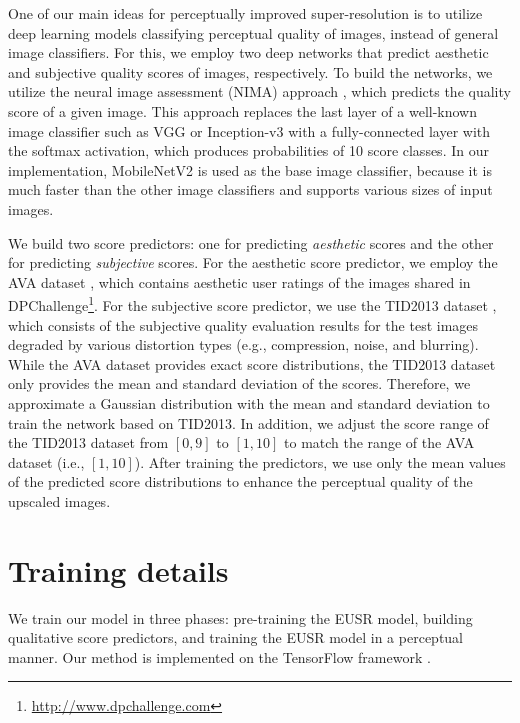 \documentclass[runningheads]{llncs}
\begin{document}
One of our main ideas for perceptually improved super-resolution is to utilize deep learning models classifying perceptual quality of images, instead of general image classifiers.
For this, we employ two deep networks that predict aesthetic and subjective quality scores of images, respectively.
To build the networks, we utilize the neural image assessment (NIMA) approach \cite{talebi2018nima}, which predicts the quality score of a given image.
This approach replaces the last layer of a well-known image classifier such as VGG \cite{simonyan2014very} or Inception-v3 \cite{szegedy2016rethinking} with a fully-connected layer with the softmax activation, which produces probabilities of 10 score classes.
In our implementation, MobileNetV2 \cite{sandler2018mobilenetv2} is used as the base image classifier, because it is much faster than the other image classifiers and supports various sizes of input images.

We build two score predictors: one for predicting \textit{aesthetic} scores and the other for predicting \textit{subjective} scores.
For the aesthetic score predictor, we employ the AVA dataset \cite{murray2012ava}, which contains aesthetic user ratings of the images shared in DPChallenge\footnote{\url{http://www.dpchallenge.com}}.
For the subjective score predictor, we use the TID2013 dataset \cite{ponomarenko2015image}, which consists of the subjective quality evaluation results for the test images degraded by various distortion types (e.g., compression, noise, and blurring).
While the AVA dataset provides exact score distributions, the TID2013 dataset only provides the mean and standard deviation of the scores.
Therefore, we approximate a Gaussian distribution with the mean and standard deviation to train the network based on TID2013.
In addition, we adjust the score range of the TID2013 dataset from $[0, 9]$ to $[1, 10]$ to match the range of the AVA dataset (i.e., $[1, 10]$).
After training the predictors, we use only the mean values of the predicted score distributions to enhance the perceptual quality of the upscaled images.


\section{Training details}
\label{sec:training_details}

We train our model in three phases: pre-training the EUSR model, building qualitative score predictors, and training the EUSR model in a perceptual manner.
Our method is implemented on the TensorFlow framework \cite{abadi2016tensorflow}.
\end{document}
